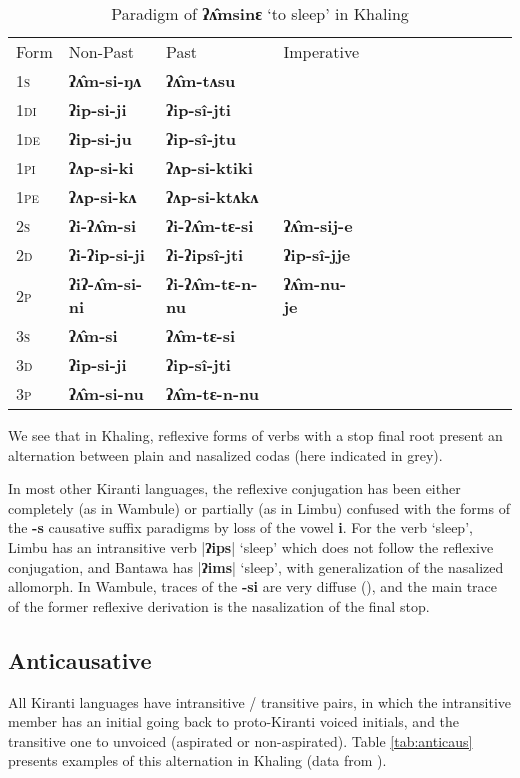 \documentclass[oneside,a4paper,11pt]{article}
\newcommand{\ipa}[1]{\textbf{{\phon\mbox{#1}}}} %
\newcommand{\grise}[1]{\cellcolor{lightgray}\textbf{#1}}
\newcommand{\dhatu}[2]{|\ipa{#1}| `#2'}
\begin{document}
\begin{table}[h]
\label{tab:ip.vr} \centering 
\caption{Paradigm of \ipa{ʔʌ̂msinɛ}  `to sleep' in Khaling }
\begin{tabular}{l|l|l|l|l|l|l|l|l|l|l|l|l} 
\toprule
Form& Non-Past & Past & Imperative \\
\textsc{1s} & \ipa{ʔʌ̂m-si-ŋʌ}  \grise{}& \ipa{ʔʌ̂m-tʌsu} \grise{}&\\ 
\textsc{1di} &\ipa{ʔip-si-ji}  & \ipa{ʔip-sî-jti}  & \\
\textsc{1de} &\ipa{ʔip-si-ju}  & \ipa{ʔip-sî-jtu}  & \\ 
\textsc{1pi} &\ipa{ʔʌp-si-ki}  & \ipa{ʔʌp-si-ktiki} & \\ 
\textsc{1pe} &\ipa{ʔʌp-si-kʌ}  & \ipa{ʔʌp-si-ktʌkʌ} &  \\ 
\textsc{2s} & \ipa{ʔi-ʔʌ̂m-si}  \grise{}& \ipa{ʔi-ʔʌ̂m-tɛ-si} \grise{} & \ipa{ʔʌ̂m-sij-e}  \grise{}\\ 
\textsc{2d} & \ipa{ʔi-ʔip-si-ji}  & \ipa{ʔi-ʔipsî-jti}  & \ipa{ʔip-sî-jje}    \\
\textsc{2p} & \ipa{ʔiʔ-ʌ̂m-si-ni} \grise{} & \ipa{ʔi-ʔʌ̂m-tɛ-n-nu} \grise{} & \ipa{ʔʌ̂m-nu-je}  \grise{}\\ 
\textsc{3s} & \ipa{ʔʌ̂m-si}  \grise{}& \ipa{ʔʌ̂m-tɛ-si}  \grise{} &\\ 
\textsc{3d} & \ipa{ʔip-si-ji}  & \ipa{ʔip-sî-jti} &  \\ 
\textsc{3p} & \ipa{ʔʌ̂m-si-nu}\grise{}  & \ipa{ʔʌ̂m-tɛ-n-nu} \grise{}&\\ 
\bottomrule
\end{tabular}
\end{table}

We see that in Khaling, reflexive forms of verbs with a stop final root present an alternation between plain and nasalized codas (here indicated in grey). 

In most other Kiranti languages, the reflexive conjugation has been either completely (as in Wambule) or partially (as in Limbu) confused with the forms of the \ipa{-s} causative suffix paradigms by loss of the vowel \ipa{i}. For the verb `sleep', Limbu has an intransitive verb \dhatu{ʔips}{sleep} which does not follow the reflexive conjugation, and Bantawa has \dhatu{ʔims}{sleep}, with generalization of the nasalized allomorph. In Wambule, traces of the \ipa{-si} are very diffuse (\citealt[305]{opgenort04wambule}), and the main trace of the former reflexive derivation is the nasalization of the final stop.
 

\subsection{Anticausative} \label{sec:anticaus}
All Kiranti languages have intransitive / transitive pairs, in which the intransitive member has an initial going back to proto-Kiranti voiced initials, and the transitive one to unvoiced (aspirated or non-aspirated). Table \ref{tab:anticaus} presents examples of this alternation in Khaling (data from \citealt{jacques15derivational.khaling}).
\end{document}
